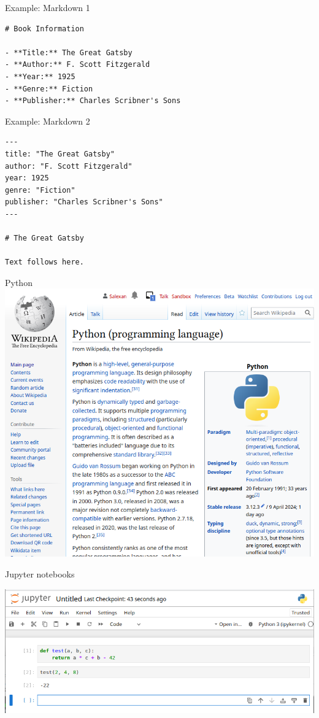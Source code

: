 \documentclass[aspectratio=169,graphics,handout]{beamer}
\begin{document}
\begin{frame}[fragile]{Example: Markdown 1}
\begin{verbatim}
# Book Information

- **Title:** The Great Gatsby
- **Author:** F. Scott Fitzgerald
- **Year:** 1925
- **Genre:** Fiction
- **Publisher:** Charles Scribner's Sons
\end{verbatim}
\end{frame}

\begin{frame}[fragile]{Example: Markdown 2}
\begin{verbatim}
---
title: "The Great Gatsby"
author: "F. Scott Fitzgerald"
year: 1925
genre: "Fiction"
publisher: "Charles Scribner's Sons"
---

# The Great Gatsby

Text follows here.

\end{verbatim}
\end{frame}

\begin{frame}{Python}
    \includegraphics[width=\textwidth]{python.png}
\end{frame}

\begin{frame}{Jupyter notebooks}

    \includegraphics[width=\textwidth]{screenshot_jupyter.png}
\end{frame}
\end{document}
